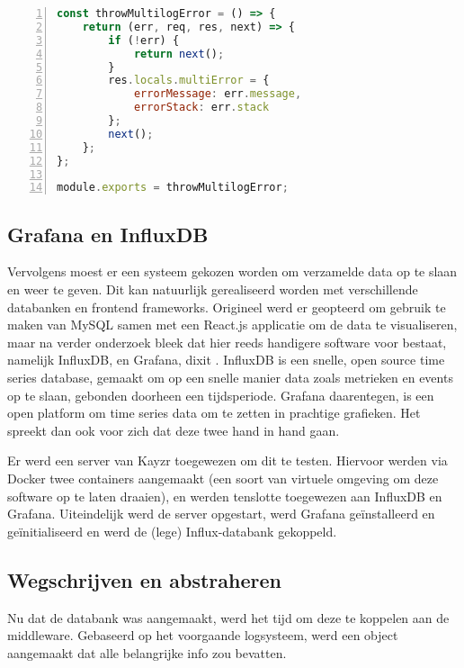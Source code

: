 \begin{lstlisting}[language=JavaScript, breaklines=true, numbers=left, frame=single, caption={MultiError.js, de custom error handler},label=code:multiError]
const throwMultilogError = () => {
	return (err, req, res, next) => {
		if (!err) {
			return next();
		}
		res.locals.multiError = {
			errorMessage: err.message,
			errorStack: err.stack
		};
		next();
	};
};

module.exports = throwMultilogError;
\end{lstlisting}

\subsection{Grafana en InfluxDB}
\label{sec:grafanaAndInflux}

Vervolgens moest er een systeem gekozen worden om verzamelde data op te slaan en weer te geven. Dit kan natuurlijk gerealiseerd worden met verschillende databanken en frontend frameworks. Origineel werd er geopteerd om gebruik te maken van MySQL samen met een React.js applicatie om de data te visualiseren, maar na verder onderzoek bleek dat hier reeds handigere software voor bestaat, namelijk InfluxDB, en Grafana, dixit \textcite{Hill2015}. InfluxDB is een snelle, open source time series database, gemaakt om op een snelle manier data zoals metrieken en events op te slaan, gebonden doorheen een tijdsperiode. Grafana daarentegen, is een open platform om time series data om te zetten in prachtige grafieken. Het spreekt dan ook voor zich dat deze twee hand in hand gaan.

Er werd een server van Kayzr toegewezen om dit te testen. Hiervoor werden via Docker twee containers aangemaakt (een soort van virtuele omgeving om deze software op te laten draaien), en werden tenslotte toegewezen aan InfluxDB en Grafana. Uiteindelijk werd de server opgestart, werd Grafana geïnstalleerd en geïnitialiseerd en werd de (lege) Influx-databank gekoppeld. 

\subsection{Wegschrijven en abstraheren}
\label{sec:abstraction}
Nu dat de databank was aangemaakt, werd het tijd om deze te koppelen aan de middleware. Gebaseerd op het voorgaande logsysteem, werd een object aangemaakt dat alle belangrijke info zou bevatten. 

